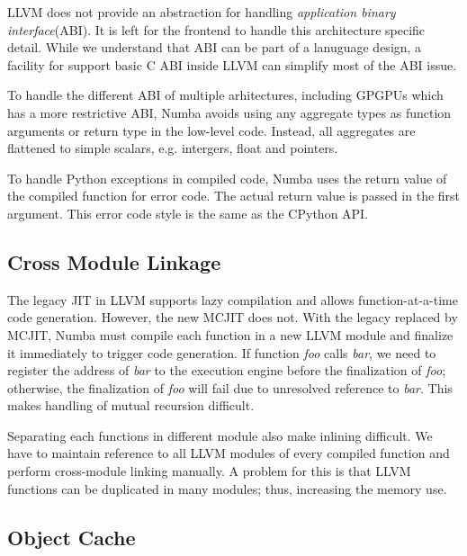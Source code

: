 \documentclass{acm_proc_article-sp}
\begin{document}
LLVM does not provide an abstraction for handling \textit{application binary
interface}(ABI). It is left for the frontend to handle this architecture
specific detail.  While we understand that ABI can be part of a lanuguage
design, a facility for support basic C ABI inside LLVM can simplify most of the
ABI issue.

To handle the different ABI of multiple arhitectures, including GPGPUs which
has a more restrictive ABI, Numba avoids using any aggregate types as function
arguments or return type in the low-level code.  Instead, all aggregates are
flattened to simple scalars, e.g. intergers, float and pointers.

To handle Python exceptions in compiled code, Numba uses the return value of
the compiled function for error code. The actual return value is passed
in the first argument. This error code style is the same as the CPython API.

\subsection{Cross Module Linkage}

The legacy JIT in LLVM supports lazy compilation and allows function-at-a-time
code generation.  However, the new MCJIT does not. With the legacy replaced
by MCJIT, Numba must compile each function in a new LLVM module and finalize it
immediately to trigger code generation. If function \textit{foo} calls
\textit{bar}, we need to register the address of \textit{bar} to the execution
engine before the finalization of \textit{foo}; otherwise, the finalization of
\textit{foo} will fail due to unresolved reference to \textit{bar}.
This makes handling of mutual recursion difficult.

Separating each functions in different module also make inlining difficult.
We have to maintain reference to all LLVM modules of every compiled function
and perform cross-module linking manually. A problem for this is that
LLVM functions can be duplicated in many modules; thus, increasing the memory
use.


\subsection{Object Cache}
\end{document}
